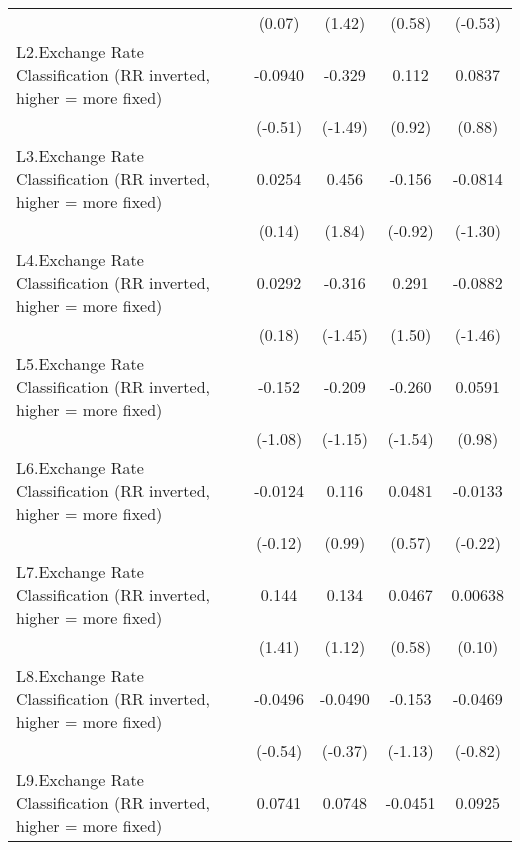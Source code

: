 {\begin{longtable}{l*{4}{c}}
                &   (0.07)         &   (1.42)         &   (0.58)         &  (-0.53)         \\
[1em]
L2.Exchange Rate Classification (RR inverted, higher = more fixed)&  -0.0940         &   -0.329         &    0.112         &   0.0837         \\
                &  (-0.51)         &  (-1.49)         &   (0.92)         &   (0.88)         \\
[1em]
L3.Exchange Rate Classification (RR inverted, higher = more fixed)&   0.0254         &    0.456         &   -0.156         &  -0.0814         \\
                &   (0.14)         &   (1.84)         &  (-0.92)         &  (-1.30)         \\
[1em]
L4.Exchange Rate Classification (RR inverted, higher = more fixed)&   0.0292         &   -0.316         &    0.291         &  -0.0882         \\
                &   (0.18)         &  (-1.45)         &   (1.50)         &  (-1.46)         \\
[1em]
L5.Exchange Rate Classification (RR inverted, higher = more fixed)&   -0.152         &   -0.209         &   -0.260         &   0.0591         \\
                &  (-1.08)         &  (-1.15)         &  (-1.54)         &   (0.98)         \\
[1em]
L6.Exchange Rate Classification (RR inverted, higher = more fixed)&  -0.0124         &    0.116         &   0.0481         &  -0.0133         \\
                &  (-0.12)         &   (0.99)         &   (0.57)         &  (-0.22)         \\
[1em]
L7.Exchange Rate Classification (RR inverted, higher = more fixed)&    0.144         &    0.134         &   0.0467         &  0.00638         \\
                &   (1.41)         &   (1.12)         &   (0.58)         &   (0.10)         \\
[1em]
L8.Exchange Rate Classification (RR inverted, higher = more fixed)&  -0.0496         &  -0.0490         &   -0.153         &  -0.0469         \\
                &  (-0.54)         &  (-0.37)         &  (-1.13)         &  (-0.82)         \\
[1em]
L9.Exchange Rate Classification (RR inverted, higher = more fixed)&   0.0741         &   0.0748         &  -0.0451         &   0.0925         \\

\end{longtable}}
